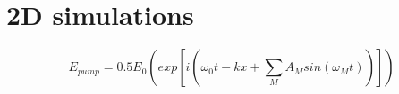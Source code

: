 \section{2D simulations}
    $$E_{pump} = 0.5E_0\left(exp[i(\omega_0t-kx+\sum_MA_Msin(\omega_Mt))]\right)$$




